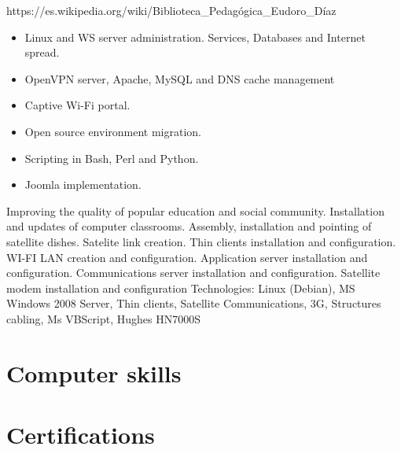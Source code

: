 \documentclass[11pt,a4paper,sans]{moderncv}        %
\begin{document}
  {
    https://es.wikipedia.org/wiki/Biblioteca\_Pedagógica\_Eudoro\_Díaz\\
    \begin{itemize}
      \item Linux and WS server administration. Services, Databases and Internet spread.
      \item OpenVPN server, Apache, MySQL and DNS cache management
      \item Captive Wi-Fi portal.
      \item Open source environment migration.
      \item Scripting in Bash, Perl and Python.
      \item Joomla implementation.
    \end{itemize}
  }
  {
    Improving the quality of popular education and social community. Installation and updates of computer classrooms. Assembly, installation and pointing of satellite dishes. Satelite link creation. Thin clients installation and configuration. WI-FI LAN creation and configuration. Application server installation and configuration. Communications server installation and configuration. Satellite modem installation and configuration Technologies: Linux (Debian), MS Windows 2008 Server, Thin clients, Satellite Communications, 3G, Structures cabling, Ms VBScript, Hughes HN7000S
  }

\clearpage
\section{Computer skills}

\section{Certifications}
\end{document}
